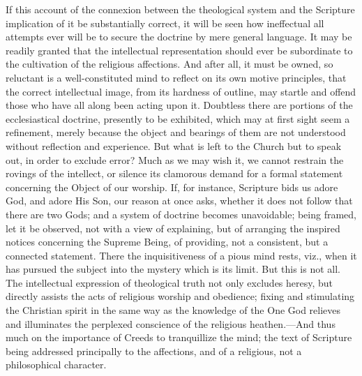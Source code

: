 If this account of the connexion between the theological system and
the Scripture implication of it be substantially correct, it will be
seen how ineffectual all attempts ever will be to secure the doctrine
by mere general language. It may be readily granted that the
intellectual representation should ever be subordinate to the
cultivation of the religious affections. And after all, it must be
owned, so reluctant is a well-constituted mind to reflect on its own
motive principles, that the correct intellectual image, from its
hardness of outline, may startle and offend those who have all along
been acting upon it. Doubtless there are portions of the
ecclesiastical doctrine, presently to be exhibited, which may at
first sight seem a refinement, merely because the object and bearings
of them are not understood without reflection and experience. But what
is left to the Church but to speak out, in order to exclude error?
Much as we may wish it, we cannot restrain the rovings of the
intellect, or silence its clamorous demand for a formal statement
concerning the Object of our worship. If, for instance, Scripture bids
us adore God, and adore His Son, our reason at once asks, whether it
does not follow that there are two Gods; and a system of doctrine
becomes unavoidable; being framed, let it be observed, not with a view
of explaining, but of arranging the inspired notices concerning the
Supreme Being, of providing, not a consistent, but a connected
statement. There the inquisitiveness of a pious mind rests, viz., when
it has pursued the subject into the mystery which is its limit. But
this is not all. The intellectual expression of theological truth not
only excludes heresy, but directly assists the acts of religious
worship and obedience; fixing and stimulating the Christian spirit in
the same way as the knowledge of the One God relieves and illuminates
the perplexed conscience of the religious heathen.—And thus much on
the importance of Creeds to tranquillize the mind; the text of
Scripture being addressed principally to the affections, and of a
religious, not a philosophical character.

